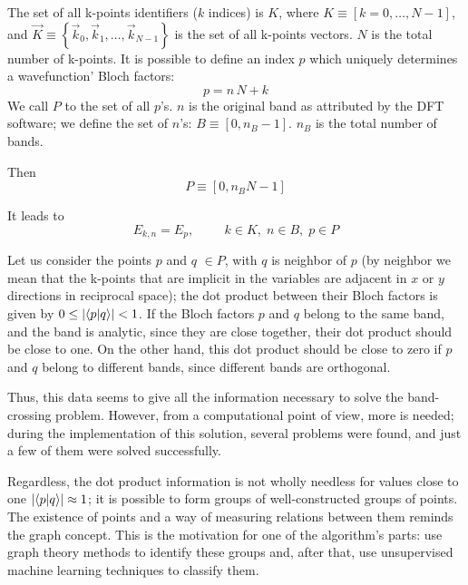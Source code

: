 \documentclass[a4paper,12pt]{report}
\begin{document}
\begin{appendices}
The set of all k-points identifiers ($k$ indices) is $K$, where $K \equiv \left[k = 0,\dots,  N-1\right]$, and $\vec{K}\equiv \left\{\vec{k}_0, \vec{k}_1, \dots, \vec{k}_{N-1}\right\}$ is the set of all k-points vectors.
$N$ is the total number of k-points.
It is possible to define an index $p$ which uniquely determines a wavefunction' Bloch factors:
\begin{equation}
    p = n\, N + k
\end{equation}
We call $P$ to the set of all $p$'s.
$n$ is the original band as attributed by the DFT software; we define the set of $n$'s: $B\equiv\left[0, n_B-1\right]$.
$n_B$ is the total number of bands.


Then
\begin{equation}
    P \equiv \left[0, n_B N -1\right]
\end{equation}

It leads to
\begin{equation}
    E_{k,n} = E_p,\hspace{1cm} k\in K, \; n\in B,\; p\in P
\end{equation}

Let us consider the points $p$ and $q$ $\in P$, with $q$ is neighbor of $p$
(by neighbor we mean that the k-points that are implicit in the variables are adjacent in $x$ or $y$ directions in reciprocal space);
the dot product between their Bloch factors is given by $0\leq \left|\braket{p}{q}\right|< 1$.
If the Bloch factors $p$ and $q$ belong to the same band, and the band is analytic, since they are close together, their dot product should be close to one.
On the other hand, this dot product should be close to zero if $p$ and $q$ belong to different bands, since different bands are orthogonal.

Thus, this data seems to give all the information necessary to solve the band-crossing problem.
However, from a computational point of view, more is needed;
during the implementation of this solution, several problems were found, and just a few of them were solved successfully.

Regardless, the dot product information is not wholly needless for values close to one $\left|\braket{p}{q}\right|\approx 1$;
it is possible to form groups of well-constructed groups of points.
The existence of points and a way of measuring relations between them reminds the graph concept.
This is the motivation for one of the algorithm's parts:
use graph theory methods to identify these groups and, after that, use unsupervised machine learning techniques to classify them.


\end{appendices}
\end{document}
